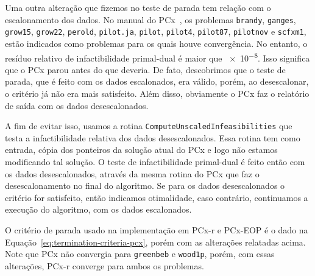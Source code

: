 Uma outra alteração  que fizemos no teste de parada tem relação com o escalonamento dos dados. No manual do PCx~\cite[p. 20]{Czyzyk:1998vw},  os problemas \texttt{brandy}, \texttt{ganges}, \texttt{grow15}, \texttt{grow22}, \texttt{perold}, \texttt{pilot.ja}, \texttt{pilot}, \texttt{pilot4}, \texttt{pilot87}, \texttt{pilotnov} e \texttt{scfxm1}, estão indicados como problemas para os quais houve convergência. No entanto, o resíduo relativo de infactibilidade primal-dual é maior que \num{e-8}. Isso significa que o PCx parou antes do que deveria. De fato, descobrimos que  o teste de parada, que é feito com os dados escalonados, era válido, porém, ao desescalonar, o critério já não era mais satisfeito. Além disso, obviamente o PCx faz o relatório de saída com os dados desescalonados. 

A fim de evitar isso, usamos a rotina \verb|ComputeUnscaledInfeasibilities| que testa a infactibilidade relativa dos dados desescalonados. Essa rotina tem como entrada, cópia dos ponteiros da solução atual do PCx e logo não estamos modificando tal solução. O teste de infactibilidade primal-dual é feito então com os dados desescalonados, através da mesma rotina do PCx que  faz o desescalonamento no final do algoritmo. Se para os dados desescalonados o critério for satisfeito, então indicamos otimalidade, caso contrário, continuamos a execução do algoritmo, com os dados escalonados. 


O critério de parada usado  na implementação em PCx-r e PCx-EOP é o dado na Equação~\eqref{eq:termination-criteria-pcx}, porém com  as alterações relatadas acima. Note que PCx não convergia para \texttt{greenbeb} e \texttt{wood1p}, porém, com essas alterações, PCx-r converge para ambos os problemas. 









